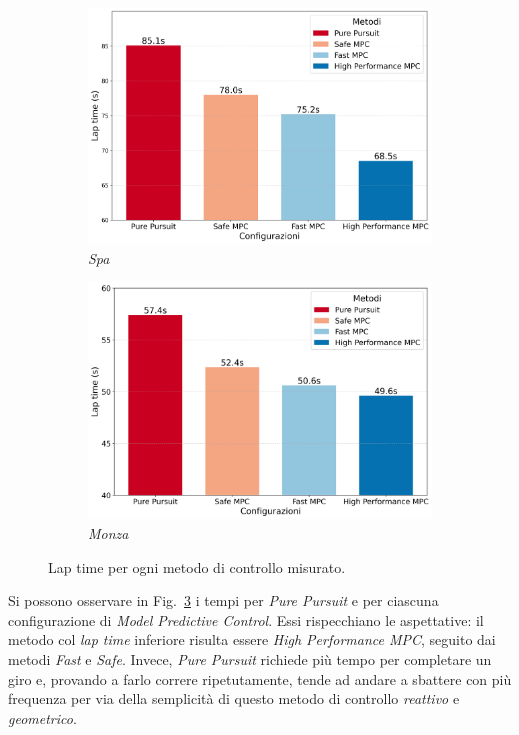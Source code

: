 \begin{figure}[H]
    \centering
    \begin{subfigure}[b]{0.49\textwidth}
        \centering
        \includegraphics[width=\textwidth]{images/spa_lap_time_comparisons.png} 
        \caption{\textit{Spa}}
        \label{fig:laptime_spa}
    \end{subfigure}
    \begin{subfigure}[b]{0.49\textwidth}
        \centering
        \includegraphics[width=\textwidth]{images/monza_lap_time_comparisons.png}
        \caption{\textit{Monza}}
        \label{fig:laptime_monza}
    \end{subfigure}
    \caption{Lap time per ogni metodo di controllo misurato.}
    \label{fig:fig13} %
\end{figure}
Si possono osservare in Fig.~\ref{fig:fig13} i tempi per \textit{Pure Pursuit}
e per ciascuna configurazione di \textit{Model Predictive Control}.
Essi rispecchiano le aspettative: il metodo col \textit{lap time} inferiore risulta essere 
\textit{High Performance MPC}, seguito dai metodi \textit{Fast} e \textit{Safe}. 
Invece, \textit{Pure Pursuit} richiede più tempo per completare un giro e, provando a farlo 
correre ripetutamente, tende ad andare a sbattere con più frequenza per via della semplicità di 
questo metodo di controllo \textit{reattivo} e \textit{geometrico}.

